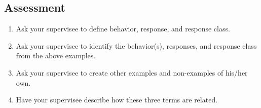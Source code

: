 \subsection{Assessment}
\begin{enumerate}
\item Ask your supervisee to define behavior, response, and response class. 
\item Ask your supervisee to identify the behavior(s), responses, and response class from the above examples.  
\item Ask your supervisee to create other examples and non-examples of his/her own. 
\item Have your supervisee describe how these three terms are related. 
%
\end{enumerate}
%
